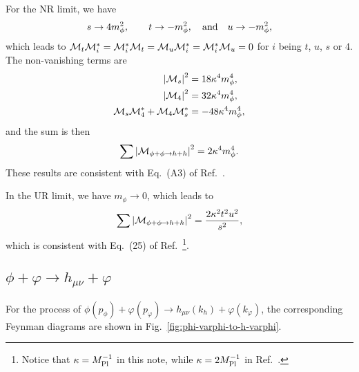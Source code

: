 \documentclass{article}
\begin{document}
            For the NR limit, we have
            \begin{equation}
                s \to 4 m_\phi^2, \qquad t \to -m_\phi^2, \qand u \to -m_\phi^2,
            \end{equation}
            which leads to $\mathcal{M}_t \mathcal{M}_i^* = \mathcal{M}_i^* \mathcal{M}_t = \mathcal{M}_u \mathcal{M}_i^* = \mathcal{M}_i^* \mathcal{M}_u = 0$ for $i$ being $t$, $u$, $s$ or $4$.
            The non-vanishing terms are
            \begin{align}
                \Msqr[s] & = 18 \kappa^4 m_\phi^4, \\
                \Msqr[4] & = 32 \kappa^4 m_\phi^4, \\
                \calM_s \calM_4^* + \calM_4 \calM_s^* & = -48 \kappa^4 m_\phi^4,
            \end{align}
            and the sum is then
            \begin{equation}
                \sumMsqr[\phi + \phi \to h + h] = 2 \kappa^4 m_\phi^4.
            \end{equation}
            These results are consistent with Eq.~(A3) of Ref.~\cite{Choi:2024ilx}.

            In the UR limit, we have $m_\phi \to 0$, which leads to
            \begin{equation}
                \sumMsqr[\phi + \phi \to h + h] = \frac{2 \kappa^2 t^2 u^2}{s^2},
            \end{equation}
            which is consistent with Eq.~(25) of Ref.~\cite{Ghiglieri:2022rfp}\footnote{Notice that $\kappa = M_\mathrm{Pl}^{-1}$ in this note, while $\kappa = 2 M_\mathrm{Pl}^{-1}$ in Ref.~\cite{Ghiglieri:2022rfp}.}.
    
        \subsection{\boldmath \texorpdfstring{\boldmath $\phi + \varphi \to h_{\mu\nu} + \varphi$}{ϕ + φ → h\_{µν} + φ}}
        
            For the process of $\phi(p_\phi) + \varphi(p_\varphi) \to h_{\mu\nu}(k_h) + \varphi(k_\varphi)$, the corresponding Feynman diagrams are shown in Fig.~\ref{fig:phi-varphi-to-h-varphi}.
\end{document}

